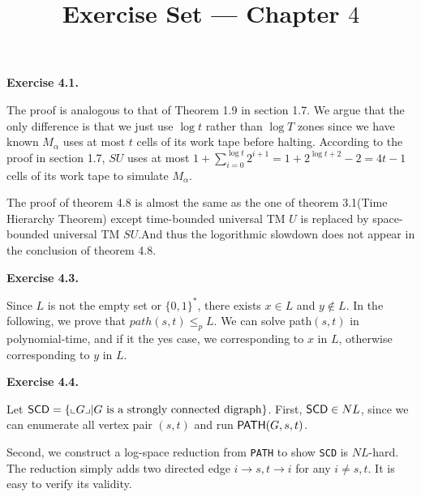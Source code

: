 \documentclass[a4paper]{article}
\title{Exercise Set --- Chapter $4$}
\date{}
\newenvironment{exercise}[1]{
	\par
	\noindent\textbf{Exercise #1.}\quad
}{
	\par
	\bigskip
}
\newcommand{\cbra}[1]{\left\{ #1 \right\}}
\begin{document}
\maketitle

\begin{exercise}{4.1}   
    The proof is analogous to that of Theorem 1.9 in section 1.7. We argue that the only difference is 
    that we just use $\log t$ rather than $\log T$ zones since we have known $M_{\alpha}$ uses at most $t$ cells of its work tape before halting. According to the proof in section 1.7, $SU$ uses at most $1+\sum_{i=0}^{\log t} 2^{i+1}=1+2^{\log t+2 }-2=4t-1$ cells of its work tape to simulate $M_{\alpha}$.
    
    The proof of theorem 4.8 is almost the same as the one of theorem 3.1(Time Hierarchy Theorem) except time-bounded universal TM $U$ is replaced by space-bounded universal TM $SU$.And thus the logorithmic slowdown does not appear in the conclusion of theorem 4.8.
\end{exercise}

\begin{exercise}{4.3}
Since $L$ is not the empty set or $\{0,1\}^{*}$, there exists $x\in L$ and $y\not\in L$. In the following, we prove that $path(s,t)\leq_{p} L$. We can solve path$(s,t)$ in polynomial-time, and if it the yes case, we corresponding to $x$ in $L$, otherwise corresponding to $y$ in $L$.
\end{exercise}

\begin{exercise}{4.4}
    Let $\texttt{\sf SCD}=\cbra{\llcorner G\lrcorner\middle| G\text{ is a strongly connected digraph}}$.
    First, $\texttt{\sf SCD}\in NL$, since we can enumerate all vertex pair $(s,t)$ and run $\texttt{\sf PATH}(G,s,t)$.

    Second, we construct a log-space reduction from \texttt{\sf PATH} to show \texttt{\sf SCD} is $NL$-hard.
    The reduction simply adds two directed edge $i\to s,t\to i$ for any $i\neq s,t$. 
    It is easy to verify its validity.
\end{exercise}
\end{document}
